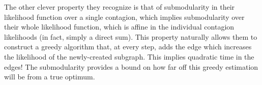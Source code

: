 \documentclass[a4paper,12pt]{article}
\begin{document}
The other clever property they recognize is that of submodularity in their likelihood function over a single contagion, which implies submodularity over their whole likelihood function, which is affine in the individual contagion likelihoods (in fact, simply a direct sum). This property naturally allows them to construct a greedy algorithm that, at every step, adds the edge which increases the likelihood of the newly-created subgraph. This implies quadratic time in the edges! The submodularity provides a bound on how far off this greedy estimation will be from a true optimum.

\printbibliography
\end{document}
